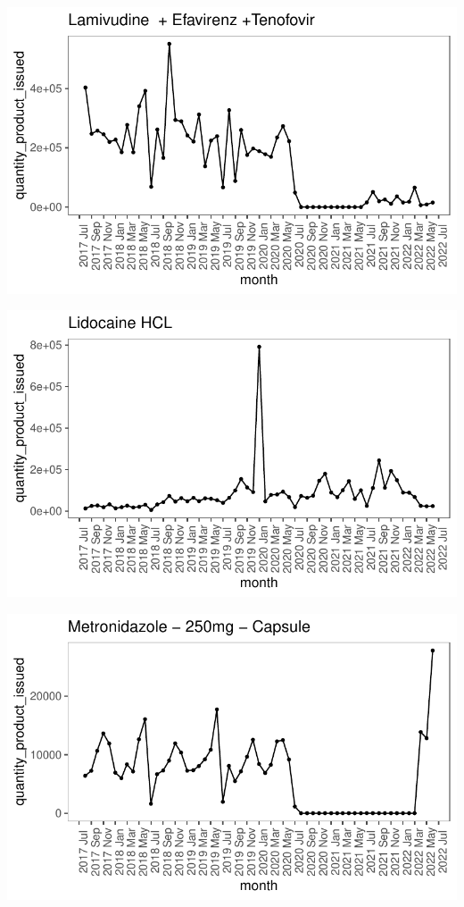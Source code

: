 \documentclass[
  authoryear,
  preprint,
  3p]{elsarticle}
\begin{document}
\includegraphics{main_files/figure-pdf/unnamed-chunk-19-1.pdf}

\includegraphics{main_files/figure-pdf/unnamed-chunk-20-1.pdf}

\includegraphics{main_files/figure-pdf/unnamed-chunk-21-1.pdf}
\end{document}

